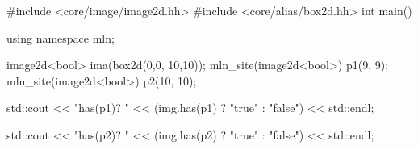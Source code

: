 #include <core/image/image2d.hh>
#include <core/alias/box2d.hh>
int main()
{
  using namespace mln;

  image2d<bool> ima(box2d(0,0, 10,10));
  mln_site(image2d<bool>) p1(9, 9);
  mln_site(image2d<bool>) p2(10, 10);

  std::cout << "has(p1)? "
	    << (img.has(p1) ? "true" : "false")
	    << std::endl;

  std::cout << "has(p2)? "
	    << (img.has(p2) ? "true" : "false")
	    << std::endl;
}
